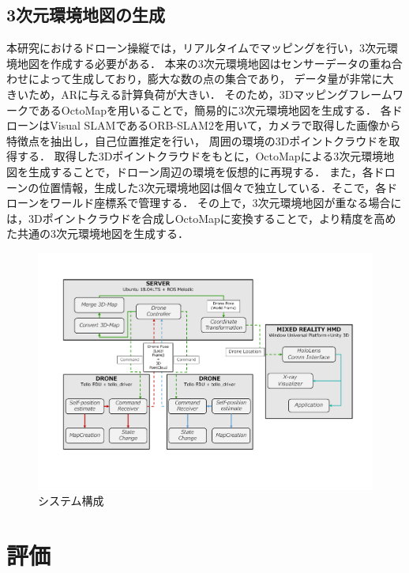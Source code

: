 \documentclass[a4paper,10pt,twocolumn,uplatex]{jsarticle}
\begin{document}
\subsection{3次元環境地図の生成}
本研究におけるドローン操縦では，リアルタイムでマッピングを行い，3次元環境地図を作成する必要がある．
本来の3次元環境地図はセンサーデータの重ね合わせによって生成しており，膨大な数の点の集合であり，
データ量が非常に大きいため，ARに与える計算負荷が大きい．
そのため，3DマッピングフレームワークであるOctoMapを用いることで，簡易的に3次元環境地図を生成する．
各ドローンはVisual SLAMであるORB-SLAM2を用いて，カメラで取得した画像から特徴点を抽出し，自己位置推定を行い，
周囲の環境の3Dポイントクラウドを取得する．
取得した3Dポイントクラウドをもとに，OctoMapによる3次元環境地図を生成することで，ドローン周辺の環境を仮想的に再現する．
また，各ドローンの位置情報，生成した3次元環境地図は個々で独立している．そこで，各ドローンをワールド座標系で管理する．
その上で，3次元環境地図が重なる場合には，3Dポイントクラウドを合成しOctoMapに変換することで，より精度を高めた共通の3次元環境地図を生成する．


\begin{figure}[!tb]
  \centering
  \includegraphics[width=\linewidth]{img/system.pdf}
  \caption{システム構成}
  \label{fig:system}
\end{figure}
  

\section{評価}
\end{document}
